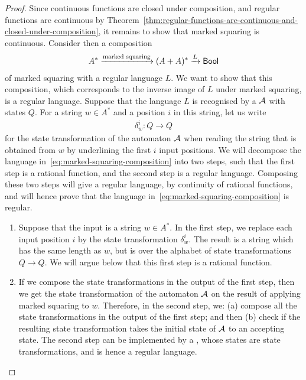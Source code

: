 \begin{proof}
    Since continuous functions are closed under composition, and regular functions are continuous by Theorem~\ref{thm:regular-functions-are-continuous-and-closed-under-composition}, it remains to show that marked squaring is continuous. Consider then a composition 
    \begin{align}\label{eq:marked-squaring-composition}
    A^* \xrightarrow{\text{marked squaring}} (A+A)^* \xrightarrow L \mathsf{Bool}
    \end{align}
    of marked squaring with a regular language $L$. We want to show that this composition, which corresponds to the inverse image of $L$ under marked squaring, is a regular language. Suppose that the language $L$ is recognised by a \dfa  ${\mathcal A}$ with states $Q$.     For a string $w  \in A^*$ and a position $i$ in this string, let us write
    \begin{align*}
    \delta_w^i : Q \to Q
    \end{align*}
    for the state transformation of the automaton ${\mathcal A}$ when reading the string that is obtained from $w$ by underlining the first $i$  input positions.  We will decompose the language in~\eqref{eq:marked-squaring-composition} into two steps, such that the first step is a rational function, and the second step is a regular language. Composing these two steps will give a regular language, by continuity of rational functions, and will hence prove that the language in~\eqref{eq:marked-squaring-composition} is regular. 
    \begin{enumerate}
        \item Suppose that the input is a string $w \in A^*$.  In the first step, we replace each input position $i$ by the state transformation $\delta_w^i$. The result is a string which has the same length as $w$, but is over the alphabet of state transformations $Q \to Q$. We will argue below that this first step is a rational function.

        \item If we compose the state transformations in the output of the first step, then we get the state transformation of the automaton ${\mathcal A}$ on the result of applying marked squaring to $w$. Therefore, in the second step, we: (a) compose all the state transformations in the output of the first step; and then  (b) check if the resulting state transformation takes the initial state of ${\mathcal A}$ to an accepting state. The second step can be implemented by a \dfa, whose states are state transformations, and is hence a regular language. 
    \end{enumerate}


\end{proof}
